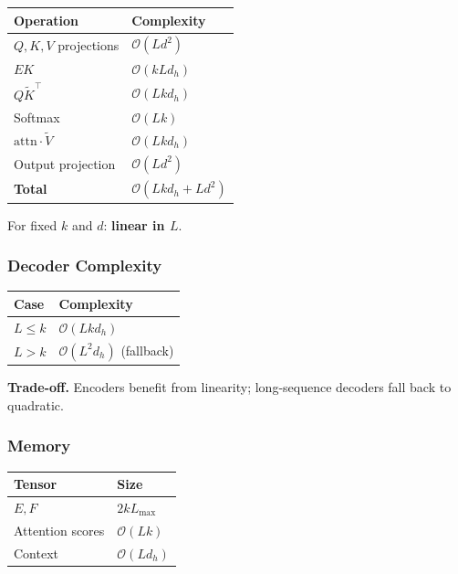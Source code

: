 \begin{table}[H]
\centering
\small
\begin{tabular}{ll}
\toprule
\textbf{Operation} & \textbf{Complexity} \\
\midrule
$Q, K, V$ projections & $\mathcal{O}(L d^2)$ \\
$E K$ & $\mathcal{O}(k L d_h)$ \\
$Q \tilde{K}^\top$ & $\mathcal{O}(L k d_h)$ \\
Softmax & $\mathcal{O}(L k)$ \\
$\text{attn} \cdot \tilde{V}$ & $\mathcal{O}(L k d_h)$ \\
Output projection & $\mathcal{O}(L d^2)$ \\
\textbf{Total} & $\mathcal{O}(L k d_h + L d^2)$ \\
\bottomrule
\end{tabular}
\end{table}

For fixed $k$ and $d$: \textbf{linear in $L$}.

\subsubsection{Decoder Complexity}

\begin{table}[H]
\centering
\small
\begin{tabular}{ll}
\toprule
\textbf{Case} & \textbf{Complexity} \\
\midrule
$L \leq k$ & $\mathcal{O}(L k d_h)$ \\
$L > k$ & $\mathcal{O}(L^2 d_h)$ (fallback) \\
\bottomrule
\end{tabular}
\end{table}

\textbf{Trade-off.} Encoders benefit from linearity; long-sequence decoders 
fall back to quadratic.

\subsubsection{Memory}

\begin{table}[H]
\centering
\small
\begin{tabular}{ll}
\toprule
\textbf{Tensor} & \textbf{Size} \\
\midrule
$E, F$ & $2 k L_\text{max}$ \\
Attention scores & $\mathcal{O}(L k)$ \\
Context & $\mathcal{O}(L d_h)$ \\
\bottomrule
\end{tabular}
\end{table}

